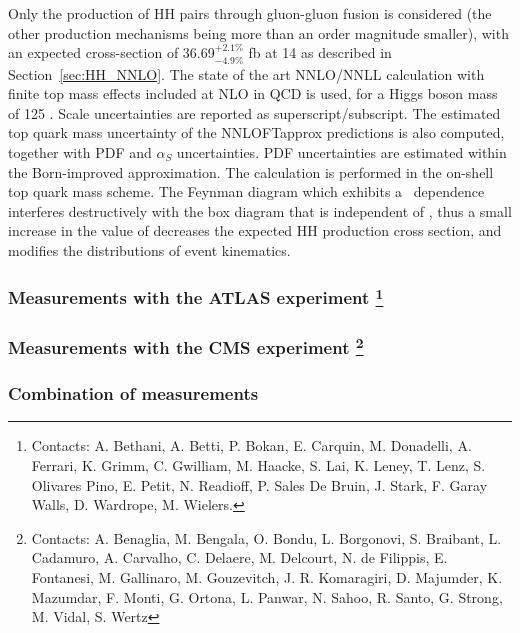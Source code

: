 \documentclass[../report.tex]{subfiles}
\providecommand{\main}{..}
\begin{document}
Only the production of HH pairs through gluon-gluon fusion is considered (the other production mechanisms being more than an order magnitude smaller), with an expected cross-section of 36.69$^{+2.1\%}_{-4.9\%}$ fb at 14 \UTeV as described in Section~\ref{sec:HH_NNLO}. The state of the art NNLO/NNLL calculation with finite top mass effects included at NLO in QCD is used, for a Higgs boson mass of 125 \UGeV. Scale uncertainties are reported as superscript/subscript. The estimated top quark mass uncertainty of the NNLOFTapprox predictions is also computed, together with PDF and $\alpha_{S}$ uncertainties. PDF uncertainties are estimated within the Born-improved approximation. The calculation is performed in the on-shell top quark mass scheme.
The Feynman diagram which exhibits a \lHHH\ dependence interferes destructively with the box diagram that is independent of \lHHH, thus a small increase in the value of \lHHH decreases the expected HH production cross section, and modifies the distributions of event kinematics.

\subsubsection{Measurements with the ATLAS experiment
\footnote{Contacts: A. Bethani, A. Betti, P. Bokan, E. Carquin, M. Donadelli, A. Ferrari, K. Grimm, C. Gwilliam, M. Haacke, S. Lai, K. Leney, T. Lenz, S. Olivares Pino, E. Petit, N. Readioff, P. Sales De Bruin, J. Stark, F. Garay Walls, D. Wardrope, M. Wielers.}}
\label{sec:HH_ATLAS}



\subsubsection{Measurements with the CMS experiment
\footnote{Contacts: A. Benaglia, M. Bengala, O. Bondu, L. Borgonovi, S. Braibant, L. Cadamuro, A. Carvalho, C. Delaere, M. Delcourt, N. de Filippis, E. Fontanesi, M. Gallinaro, M. Gouzevitch, J. R. Komaragiri, D. Majumder, K. Mazumdar, F. Monti, G. Ortona, L. Panwar, N. Sahoo, R. Santo, G. Strong, M. Vidal, S. Wertz}
\label{sec:HH_CMS}}



\subsubsection{Combination of measurements}
\label{sec:HH_Combination}
\end{document}
